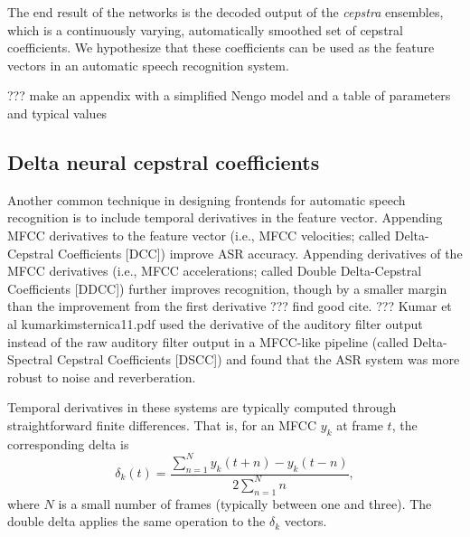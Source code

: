The end result of the networks
is the decoded output
of the \textit{cepstra} ensembles,
which is a continuously varying,
automatically smoothed set of cepstral coefficients.
We hypothesize that these coefficients can be used
as the feature vectors in an
automatic speech recognition system.

??? make an appendix with a simplified Nengo model
and a table of parameters and typical values

\subsection{Delta neural cepstral coefficients}

Another common technique in designing frontends
for automatic speech recognition is to
include temporal derivatives
in the feature vector.
Appending MFCC derivatives
to the feature vector
(i.e., MFCC velocities;
called Delta-Cepstral Coefficients [DCC])
improve ASR accuracy.
Appending derivatives of the MFCC derivatives
(i.e., MFCC accelerations;
called Double Delta-Cepstral Coefficients [DDCC])
further improves recognition,
though by a smaller margin than
the improvement from the first derivative
??? find good cite.
??? Kumar et al kumarkimsternica11.pdf
used the derivative of the auditory filter output
instead of the raw auditory filter output
in a MFCC-like pipeline
(called Delta-Spectral Cepstral Coefficients [DSCC])
and found that the ASR system
was more robust to noise and reverberation.

Temporal derivatives in these systems
are typically computed through straightforward
finite differences.
That is, for an MFCC $y_k$
at frame $t$, the corresponding delta is
\begin{equation}
  \label{dcc}
  \delta_k(t) = \frac{\sum_{n=1}^N y_k(t+n) - y_k(t-n)}{
    2 \sum_{n=1}^N n},
\end{equation}
where $N$ is a small number of frames
(typically between one and three).
The double delta applies the same operation
to the $\delta_k$ vectors.


